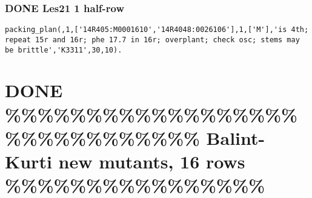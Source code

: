 \documentclass[11pt]{article}
\begin{document}
\subsubsection{{\bfseries\sffamily DONE} Les21  1 half-row}
\label{sec-4-5-11}

\begin{verbatim}
packing_plan(,1,['14R405:M0001610','14R4048:0026106'],1,['M'],'is 4th; repeat 15r and 16r; phe 17.7 in 16r; overplant; check osc; stems may be brittle','K3311',30,10).
\end{verbatim}




\section{{\bfseries\sffamily DONE} \%\%\%\%\%\%\%\%\%\%\%\%\%\%\%\%\%\%\%\%\%\%\%\%\%\%\%\%\%\% Balint-Kurti new mutants, 16 rows \%\%\%\%\%\%\%\%\%\%\%\%\%\%\%\%}
\label{sec-5}
\end{document}
